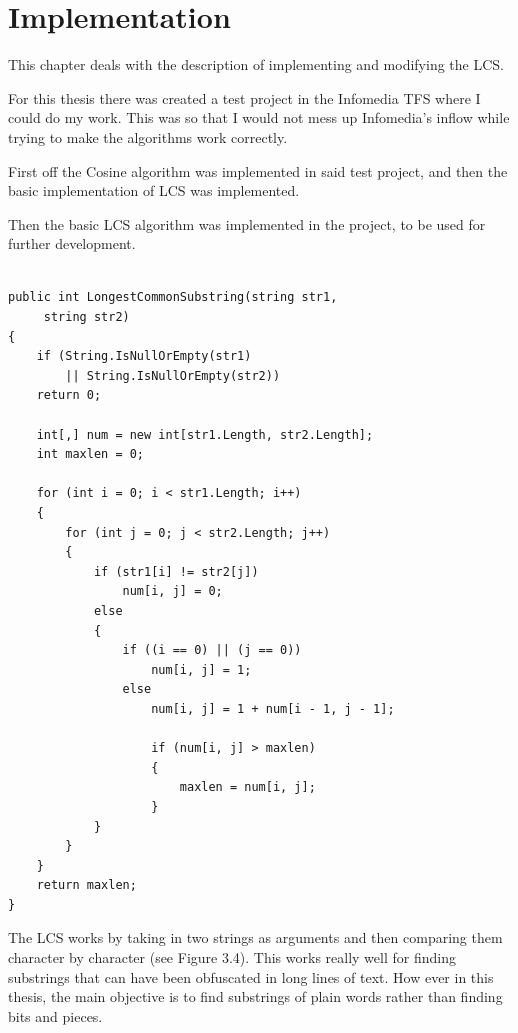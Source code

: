 \chapter{Implementation}

This chapter deals with the description of implementing and modifying the LCS.

For this thesis there was created a test project in the Infomedia TFS where I could do my work. This was so that I would not mess up Infomedia's inflow while trying to make the algorithms work correctly.

First off the Cosine algorithm was implemented in said test project, and then the basic implementation of LCS was implemented.

Then the basic LCS algorithm was implemented in the project, to be used for further development.

\lstset{style=sharpc}
\begin{lstlisting}[caption=Basic LCS implementation in C$^\sharp$, captionpos=b]

public int LongestCommonSubstring(string str1,
	 string str2)
{
    if (String.IsNullOrEmpty(str1) 
    	|| String.IsNullOrEmpty(str2))
    return 0;
	
	int[,] num = new int[str1.Length, str2.Length];
	int maxlen = 0;

    for (int i = 0; i < str1.Length; i++)
  	{
    	for (int j = 0; j < str2.Length; j++)
        {
        	if (str1[i] != str2[j])
            	num[i, j] = 0;
            else
            {
            	if ((i == 0) || (j == 0))
                	num[i, j] = 1;
                else
                    num[i, j] = 1 + num[i - 1, j - 1];

                    if (num[i, j] > maxlen)
                    {
                    	maxlen = num[i, j];
                  	}
           	}
     	}
	}
    return maxlen;
}

\end{lstlisting}

The LCS works by taking in two strings as arguments and then comparing them character by character (see Figure 3.4). This works really well for finding substrings that can have been obfuscated in long lines of text. How ever in this thesis, the main objective is to find substrings of plain words rather than finding bits and pieces.

